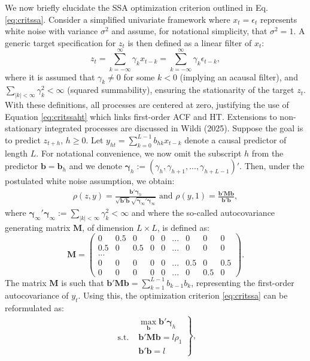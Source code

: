 \documentclass[11pt,a4paper]{article}
\begin{document}
We now briefly elucidate the SSA optimization criterion outlined in Eq.\eqref{eq:critssa}. Consider a simplified univariate framework where $x_t=\epsilon_t$ represents white noise with variance $\sigma^2$ and assume, for notational simplicity, that $\sigma^2=1$. A generic target specification for $z_t$ is then defined as a linear filter of $x_t$:
\[z_t=\sum_{k=-\infty}^\infty \gamma_k x_{t-k}=\sum_{k=-\infty}^\infty \gamma_k \epsilon_{t-k},\] 
where it is assumed that $\gamma_k\neq 0$ for some $k<0$ (implying an acausal filter), and $\sum_{|k|<\infty}\gamma_k^2<\infty$ (squared summability), ensuring the stationarity of the target $z_t$. With these definitions, all processes are centered at zero, justifying the use of Equation \eqref{eq:critssaht} which links first-order ACF and HT. Extensions to non-stationary integrated processes are discussed in Wildi (2025). Suppose the goal is to predict $z_{t+h}$, $h\geq 0$. Let $y_{h t}=\sum_{k=0}^{L-1} b_{h k}x_{t-k}$ denote a causal predictor of length $L$. For notational convenience, we now omit the subscript $h$ from the predictor $\mathbf{b}=\mathbf{b}_h$ and we denote $\boldsymbol{\gamma}_h:=(\gamma_{h},\gamma_{h+1},...,\gamma_{h+L-1})'$. %
Then, under the postulated white noise assumption, we obtain:
\begin{eqnarray*}
\rho(z,y)=\frac{\mathbf{b}'\boldsymbol{\gamma}_h}{\sqrt{\mathbf{b}'\mathbf{b}}\sqrt{\boldsymbol{\gamma}_{\infty}'\boldsymbol{\gamma}_{\infty}}} \textrm{~and~}\rho(y,1)=\frac{\mathbf{b}'\mathbf{Mb}}{\mathbf{b}'\mathbf{b}},
\end{eqnarray*} 
where $\boldsymbol{\gamma}_{\infty}'\boldsymbol{\gamma}_{\infty}:=\sum_{|k|<\infty}\gamma_k^2<\infty$ and where the so-called autocovariance generating matrix $\mathbf{M}$, of dimension $L\times L$, is defined as:
\[
\mathbf{M}=\left(\begin{array}{ccccccccc}0&0.5&0&0&0&...&0&0&0\\
0.5&0&0.5&0&0&...&0&0&0\\
...&&&&&&&&\\
0&0&0&0&0&...&0.5&0&0.5\\
0&0&0&0&0&...&0&0.5&0
\end{array}\right).
\]
The matrix $\mathbf{M}$ is such that $\mathbf{b}'\mathbf{Mb}=\sum_{k=1}^{L-1}b_{k-1}b_k$, representing the first-order autocovariance of $y_t$. Using this, the optimization criterion \eqref{eq:critssa} can be reformulated as:
\begin{eqnarray}\label{eq:crit1}
\left.\begin{array}{cc}
&\max_{\mathbf{b}}\mathbf{b}'\boldsymbol{\gamma}_{h}\\
\textrm{s.t.~}&\mathbf{b}'\mathbf{Mb}=l\rho_1\\
&\mathbf{b}'\mathbf{b}=l
\end{array}\right\},
\end{eqnarray}
\end{document}

